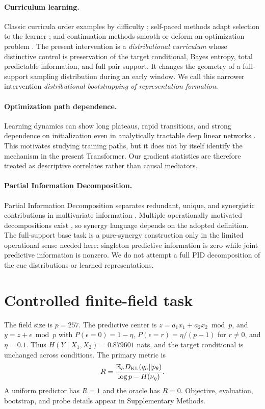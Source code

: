 \documentclass[10pt]{article}
\begin{document}
\paragraph{Curriculum learning.}
Classic curricula order examples by difficulty
\cite{bengio2009curriculum,hacohen2019curriculum}; self-paced methods adapt
selection to the learner \cite{jiang2015selfpaced}; and continuation methods
smooth or deform an optimization problem \cite{mobahi2016diffusion}. The
present intervention is a \emph{distributional curriculum} whose distinctive
control is preservation of the target conditional, Bayes entropy, total
predictable information, and full pair support. It changes the geometry of a
full-support sampling distribution during an early window. We call this
narrower intervention \emph{distributional bootstrapping of representation
formation}.

\paragraph{Optimization path dependence.}
Learning dynamics can show long plateaus, rapid transitions, and strong
dependence on initialization even in analytically tractable deep linear
networks \cite{saxe2014exact}. This motivates studying training paths, but it
does not by itself identify the mechanism in the present Transformer. Our
gradient statistics are therefore treated as descriptive correlates rather
than causal mediators.

\paragraph{Partial Information Decomposition.}
Partial Information Decomposition separates redundant, unique, and
synergistic contributions in multivariate information
\cite{williams2010pid}. Multiple operationally motivated decompositions
exist \cite{bertschinger2014unique}, so synergy language depends on the
adopted definition. The full-support base task is a pure-synergy construction
only in the limited operational sense needed here: singleton predictive
information is zero while joint predictive information is nonzero. We do not
attempt a full PID decomposition of the cue distributions or learned
representations.

\section{Controlled finite-field task}
The field size is $p=257$. The predictive center is
$z=a_1x_1+a_2x_2 \bmod p$, and $y=z+\epsilon \bmod p$ with
$P(\epsilon=0)=1-\eta$, $P(\epsilon=r)=\eta/(p-1)$ for $r\ne0$, and
$\eta=0.1$. Thus $H(Y\mid X_1,X_2)=0.879601$ nats, and the
target conditional is unchanged across conditions. The primary metric is
\[
R=\frac{\mathbb{E}_h D_{\rm KL}(q_h\Vert p_\theta)}
{\log p-H(\nu_\eta)}.
\]
A uniform predictor has $R=1$ and the oracle has $R=0$. Objective,
evaluation, bootstrap, and probe details appear in Supplementary Methods.
\end{document}
